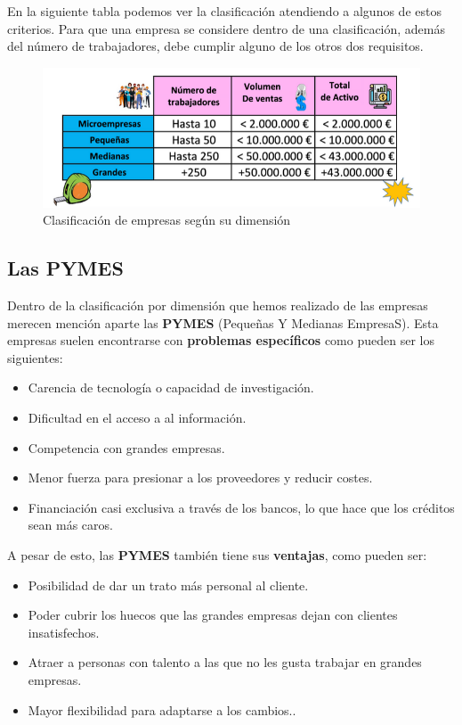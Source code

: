 En la siguiente tabla podemos ver la clasificación atendiendo a algunos de estos criterios. Para que una empresa se considere dentro de una clasificación, además del número de trabajadores, debe cumplir alguno de los otros dos requisitos.

\begin{figure}[H]
    \centering
    \includegraphics[scale=0.50]{empresas-dimension.png}
    \caption{Clasificación de empresas según su dimensión}
\end{figure}

\subsection{Las PYMES}
Dentro de la clasificación por dimensión que hemos realizado de las empresas merecen mención aparte las \textbf{PYMES} (Pequeñas Y Medianas EmpresaS). Esta empresas suelen encontrarse con \textbf{problemas específicos} como pueden ser los siguientes:

\begin{itemize}
    \item Carencia de tecnología o capacidad de investigación.
    \item Dificultad en el acceso a al información.
    \item Competencia con grandes empresas.
    \item Menor fuerza para presionar a los proveedores y reducir costes.
    \item Financiación casi exclusiva a través de los bancos, lo que hace que los créditos sean más caros.
\end{itemize}

A pesar de esto, las \textbf{PYMES} también tiene sus \textbf{ventajas}, como pueden ser:

\begin{itemize}
    \item Posibilidad de dar un trato más personal al cliente.
    \item Poder cubrir los huecos que las grandes empresas dejan con clientes insatisfechos.
    \item Atraer a personas con talento a las que no les gusta trabajar en grandes empresas.
    \item Mayor flexibilidad para adaptarse a los cambios..
\end{itemize}

